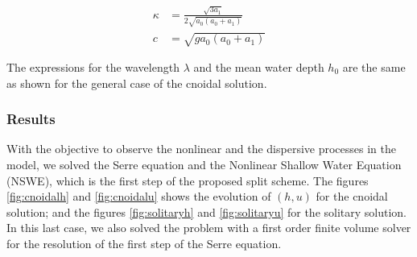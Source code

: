 \begin{align*}
    \kappa &= \frac{\sqrt{3a_1}}{2\sqrt{a_0(a_0+a_1)}} \\
    c &= \sqrt{g a_0(a_0+a_1)}
\end{align*}

\indent The expressions for the wavelength $\lambda$ and the mean water depth $h_0$ are the same as shown for the general case of the cnoidal solution.

\subsubsection{Results}

\indent With the objective to observe the nonlinear and the dispersive processes in the model, we solved the Serre equation and the Nonlinear Shallow Water Equation (NSWE), which is the first step of the proposed split scheme. The figures \ref{fig:cnoidalh} and \ref{fig:cnoidalu} shows the evolution of $(h,u)$ for the cnoidal solution; and the figures \ref{fig:solitaryh} and \ref{fig:solitaryu} for the solitary solution. In this last case, we also solved the problem with a first order finite volume solver for the resolution of the first step of the Serre equation.

